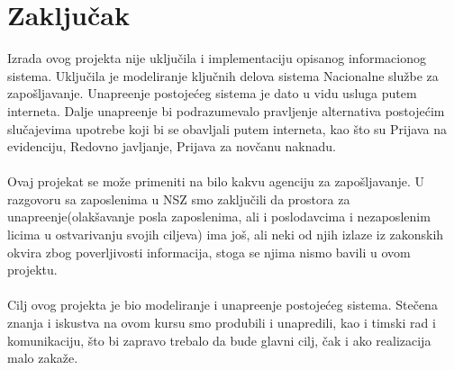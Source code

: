 \section{Zaklju\v cak}

Izrada ovog projekta nije uklju\v cila i implementaciju opisanog informacionog sistema.
Uklju\v cila je modeliranje klju\v cnih delova sistema Nacionalne slu\v zbe za zapo\v sljavanje. 
Unapre\dj enje postoje\' ceg sistema je dato u vidu usluga putem interneta. Dalje unapre\dj enje bi podrazumevalo pravljenje alternativa postoje\' cim slu\v cajevima upotrebe koji bi se obavljali putem interneta, kao \v sto su Prijava na evidenciju, Redovno javljanje, Prijava za nov\v canu naknadu.
\\
\\ Ovaj projekat se mo\v ze primeniti na bilo kakvu agenciju za zapo\v sljavanje.
U razgovoru sa zaposlenima u NSZ smo zaklju\v cili da prostora za unapre\dj enje(olak\v savanje posla zaposlenima, ali i poslodavcima i nezaposlenim licima u ostvarivanju svojih ciljeva) ima jo\v s, ali neki od njih izlaze iz zakonskih okvira zbog poverljivosti informacija, stoga se njima nismo bavili u ovom projektu.
\\
\\
Cilj ovog projekta je bio modeliranje i unapre\dj enje postoje\' ceg sistema. Ste\v cena znanja i iskustva na ovom kursu smo produbili i unapredili, kao i timski rad i komunikaciju, \v sto bi zapravo trebalo da bude glavni cilj, \v cak i ako realizacija malo zaka\v ze.